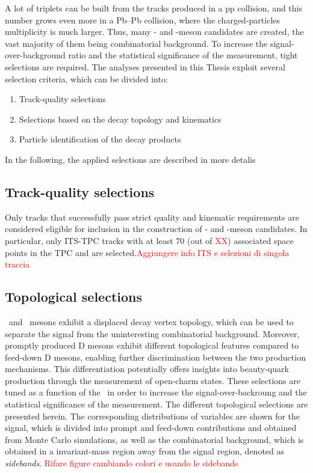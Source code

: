 A lot of triplets can be built from the tracks produced in a pp collision, and this number grows even more in a Pb--Pb collision, where the charged-particles multiplicity is much larger. Thus, many \ds- and \dpl-meson candidates are created, the vast majority of them being combinatorial background. To increase the signal-over-background ratio and the statistical significance of the measurement, tight selections are required. The analyses presented in this Thesis exploit several selection criteria, which can be divided into:
\begin{enumerate}[i]
    \item Track-quality selections
    \item Selections based on the decay topology and kinematics
    \item Particle identification of the decay products
\end{enumerate}

In the following, the applied selections are described in more detalis

\subsection{Track-quality selections}
Only tracks that successfully pass strict quality and kinematic requirements are considered eligible for inclusion in the construction of \ds- and \dpl-meson candidates. In particular, only ITS-TPC tracks with at least 70 (out of \textcolor{red}{XX}) associated space points in the TPC and are selected.\textcolor{red}{Aggiungere info ITS e selezioni di singola traccia}

\subsection{Topological selections}
\ds\ and \dpl\ mesons exhibit a displaced decay vertex topology, which can be used to separate the signal from the uninteresting combinatorial background. Moreover, promptly produced D mesons exhibit different topological features compared to feed-down D mesons, enabling further discrimination between the two production mechanisms. This differentiation potentially offers insights into beauty-quark production through the measurement of open-charm states. These selections are tuned as a function of the \pt\ in order to increase the signal-over-backroung and the statistical significance of the measurement. The different topological selections are presented herein. The corresponding distributions of variables are shown for the signal, which is divided into prompt and feed-down contributions and obtained from Monte Carlo simulations, as well as the combinatorial background, which is obtained in a invariant-mass region away from the signal region, denoted as \emph{sidebands}. \textcolor{red}{Rifare figure cambiando colori e usando le sidebands}

